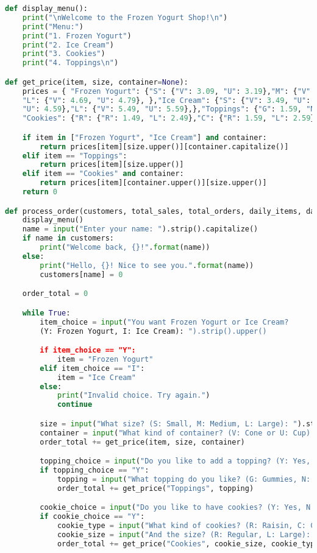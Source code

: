 \documentclass{article}
\begin{document}
\begin{lstlisting}[language=Python]
def display_menu():
    print("\nWelcome to the Frozen Yogurt Shop!\n")
    print("Menu:")
    print("1. Frozen Yogurt")
    print("2. Ice Cream")
    print("3. Cookies")
    print("4. Toppings\n")

def get_price(item, size, container=None):
    prices = { "Frozen Yogurt": {"S": {"V": 3.09, "U": 3.19},"M": {"V": 3.89, "U": 3.99},
    "L": {"V": 4.69, "U": 4.79}, },"Ice Cream": {"S": {"V": 3.49, "U": 3.59},"M": {"V": 4.49, 
    "U": 4.59},"L": {"V": 5.49, "U": 5.59},},"Toppings": {"G": 1.59, "N": 1.89},
    "Cookies": {"R": {"R": 1.49, "L": 2.49},"C": {"R": 1.59, "L": 2.59},},}

    if item in ["Frozen Yogurt", "Ice Cream"] and container:
        return prices[item][size.upper()][container.capitalize()]
    elif item == "Toppings":
        return prices[item][size.upper()]
    elif item == "Cookies" and container:
        return prices[item][container.upper()][size.upper()]
    return 0

def process_order(customers, total_sales, total_orders, daily_items, daily_totals):
    display_menu()
    name = input("Enter your name: ").strip().capitalize()
    if name in customers:
        print("Welcome back, {}!".format(name))
    else:
        print("Hello, {}! Nice to see you.".format(name))
        customers[name] = 0

    order_total = 0

    while True:
        item_choice = input("You want Frozen Yogurt or Ice Cream? 
        (Y: Frozen Yogurt, I: Ice Cream): ").strip().upper()

        if item_choice == "Y":
            item = "Frozen Yogurt"
        elif item_choice == "I":
            item = "Ice Cream"
        else:
            print("Invalid choice. Try again.")
            continue

        size = input("What size? (S: Small, M: Medium, L: Large): ").strip().upper()
        container = input("What kind of container? (V: Cone or U: Cup): ").strip().capitalize()
        order_total += get_price(item, size, container)

        topping_choice = input("Do you like to add a topping? (Y: Yes, N: No): ").strip().upper()
        if topping_choice == "Y":
            topping = input("What topping do you like? (G: Gummies, N: Nuts): ").strip().upper()
            order_total += get_price("Toppings", topping)

        cookie_choice = input("Do you like to have cookies? (Y: Yes, N: No): ").strip().upper()
        if cookie_choice == "Y":
            cookie_type = input("What kind of cookies? (R: Raisin, C: Chocolate): ").strip().upper()
            cookie_size = input("And the size? (R: Regular, L: Large): ").strip().upper()
            order_total += get_price("Cookies", cookie_size, cookie_type)


\end{lstlisting}
\end{document}
